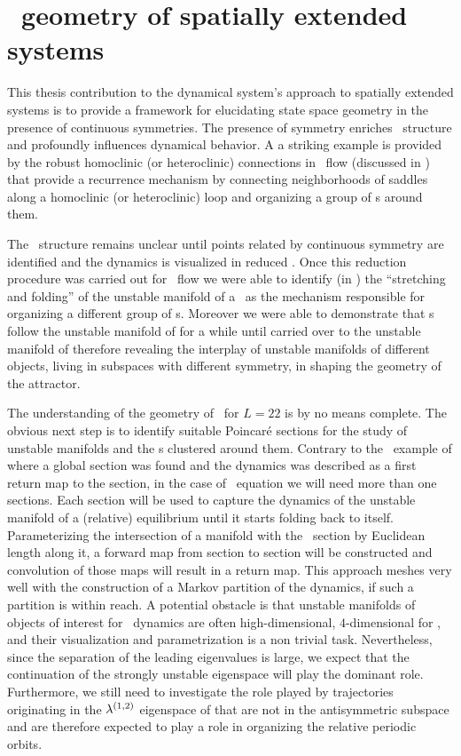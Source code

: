 
\section{\Statesp\ geometry of spatially extended systems}


This thesis contribution to the dynamical system's approach
to spatially extended systems is to provide a framework for
elucidating state space geometry in the presence of
continuous symmetries. The presence of symmetry enriches
\statesp\ structure and profoundly influences dynamical
behavior. A a striking example is provided by the robust
homoclinic (or heteroclinic) connections in \KS\ flow
(discussed in ) that provide a
recurrence mechanism by connecting neighborhoods of saddles
along a homoclinic (or heteroclinic) loop and organizing a
group of {\rpo s} around them.

The  \statesp\ structure remains unclear until points related
by continuous symmetry are identified and the dynamics is visualized in
reduced \statesp. Once this reduction procedure was carried out for \KS\ flow
we were able to identify (in ) the
``stretching and folding'' of the unstable manifold of a \reqv\ as
the mechanism responsible for organizing a different group of \rpo s. Moreover
we were able to demonstrate that \rpo s  follow the unstable manifold of 
for a while until carried over to the unstable manifold of  therefore
revealing the interplay of unstable manifolds of different objects, living
in subspaces with different symmetry, in shaping the geometry of the attractor.

The understanding of the geometry of \KSe\ for $L=22$ is by
no means complete. The obvious next step is to identify
suitable Poincar\'e sections for the study of unstable
manifolds and the \rpo s clustered around them. Contrary to
the \CLe\ example of  where a global
section was found and the dynamics was described as a first
return map to the section, in the case of \KS\ equation we
will need more than one sections. Each section will be used
to capture the dynamics of the unstable manifold of a
(relative) equilibrium until it starts folding back to
itself. Parameterizing the intersection of a manifold with
the \Poincare\ section by Euclidean length along it, a
forward map from section to section will be constructed and
convolution of those maps will result in a return map. This
approach meshes very well with the construction of a Markov
partition of the dynamics, if such a partition is within
reach. A potential obstacle is that unstable manifolds of
objects of interest for \KS\ dynamics are often
high-dimensional, \eg $4$-dimensional for , and
their visualization and parametrization is a non trivial
task. Nevertheless, since the separation of the leading
eigenvalues is large, we expect that the continuation of the
strongly unstable eigenspace will play the dominant role.
Furthermore, we still need to investigate the role played by
trajectories originating in the $\eigExp[1,2]$ eigenspace of
 that are not in the antisymmetric subspace and are
therefore expected to play a role in organizing the
relative periodic orbits.


